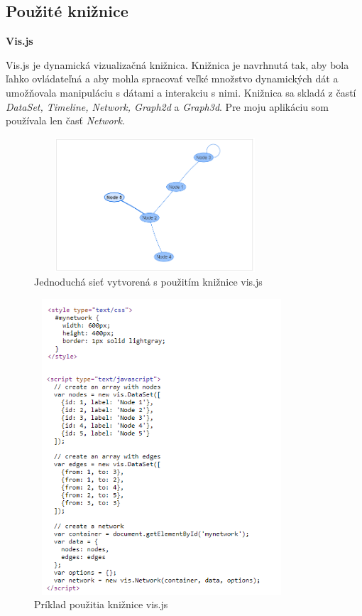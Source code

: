 \documentclass[slovak,master,public,dept460,male,cpdeclaration,oneside]{diploma}
\begin{document}
\subsection{Použité knižnice}


\textbf{Vis.js}


Vis.js je dynamická vizualizačná knižnica. Knižnica je navrhnutá tak, aby bola ľahko ovládateľná a aby mohla spracovať veľké množstvo dynamických dát a umožňovala manipuláciu s dátami a interakciu s nimi. Knižnica sa skladá z častí \textit{DataSet, Timeline, Network, Graph2d} a \textit{Graph3d}.
Pre moju aplikáciu som používala len časť \textit{Network}.

\begin{figure}[H]
\centering
\includegraphics[width=9cm, height=5cm]{figures/vis_basic_usage}
\caption{Jednoduchá sieť vytvorená s použitím knižnice vis.js}
\end{figure}


\begin{figure}[H]
\centering
\includegraphics[width=9.5cm, height=11cm]{figures/vis_basiccode}
\caption{Príklad použitia knižnice vis.js}
\end{figure}
\end{document}
